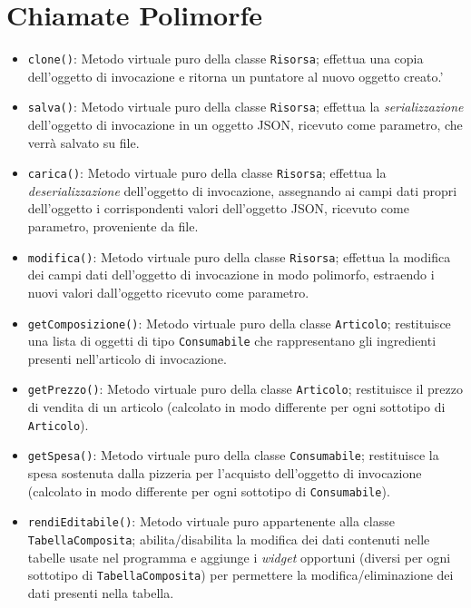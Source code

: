 \documentclass[
  10pt,
]{article}
\begin{document}
\hypertarget{chiamate-polimorfe}{%
\section{Chiamate Polimorfe}\label{chiamate-polimorfe}}

\begin{itemize}
\item
  \texttt{clone()}: Metodo virtuale puro della classe \texttt{Risorsa};
  effettua una copia dell'oggetto di invocazione e ritorna un puntatore
  al nuovo oggetto creato.'
\item
  \texttt{salva()}: Metodo virtuale puro della classe \texttt{Risorsa};
  effettua la \emph{serializzazione} dell'oggetto di invocazione in un
  oggetto JSON, ricevuto come parametro, che verrà salvato su file.
\item
  \texttt{carica()}: Metodo virtuale puro della classe \texttt{Risorsa};
  effettua la \emph{deserializzazione} dell'oggetto di invocazione,
  assegnando ai campi dati propri dell'oggetto i corrispondenti valori
  dell'oggetto JSON, ricevuto come parametro, proveniente da file.
\item
  \texttt{modifica()}: Metodo virtuale puro della classe
  \texttt{Risorsa}; effettua la modifica dei campi dati dell'oggetto di
  invocazione in modo polimorfo, estraendo i nuovi valori dall'oggetto
  ricevuto come parametro.
\item
  \texttt{getComposizione()}: Metodo virtuale puro della classe
  \texttt{Articolo}; restituisce una lista di oggetti di tipo
  \texttt{Consumabile} che rappresentano gli ingredienti presenti
  nell'articolo di invocazione.
\item
  \texttt{getPrezzo()}: Metodo virtuale puro della classe
  \texttt{Articolo}; restituisce il prezzo di vendita di un articolo
  (calcolato in modo differente per ogni sottotipo di
  \texttt{Articolo}).
\item
  \texttt{getSpesa()}: Metodo virtuale puro della classe
  \texttt{Consumabile}; restituisce la spesa sostenuta dalla pizzeria
  per l'acquisto dell'oggetto di invocazione (calcolato in modo
  differente per ogni sottotipo di \texttt{Consumabile}).
\item
  \texttt{rendiEditabile()}: Metodo virtuale puro appartenente alla
  classe \texttt{TabellaComposita}; abilita/disabilita la modifica dei
  dati contenuti nelle tabelle usate nel programma e aggiunge i
  \emph{widget} opportuni (diversi per ogni sottotipo di
  \texttt{TabellaComposita}) per permettere la modifica/eliminazione dei
  dati presenti nella tabella.
\end{itemize}
\end{document}
